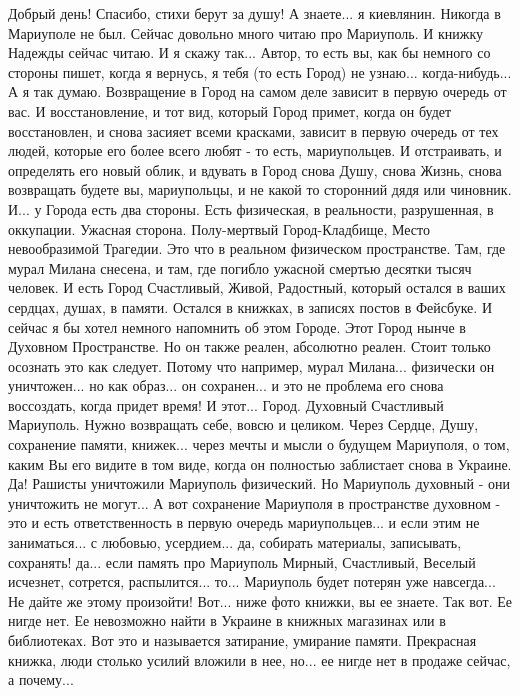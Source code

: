 Добрый день! Спасибо, стихи берут за душу! А знаете... я киевлянин. Никогда в
Мариуполе не был. Сейчас довольно много читаю про Мариуполь. И книжку Надежды
сейчас читаю. И я скажу так... Автор, то есть вы, как бы немного со стороны
пишет, когда я вернусь, я тебя (то есть Город) не узнаю... когда-нибудь... А я
так думаю. Возвращение в Город на самом деле зависит в первую очередь от вас. И
восстановление, и тот вид, который Город примет, когда он будет восстановлен, и
снова засияет всеми красками, зависит в первую очередь от тех людей, которые
его более всего любят - то есть, мариупольцев. И отстраивать, и определять его
новый облик, и вдувать в Город снова Душу, снова Жизнь, снова возвращать будете
вы, мариупольцы, и не какой то сторонний дядя или чиновник. И... у Города есть
два стороны. Есть физическая, в реальности, разрушенная, в оккупации. Ужасная
сторона. Полу-мертвый Город-Кладбище, Место невообразимой Трагедии. Это что в
реальном физическом пространстве. Там, где мурал Милана снесена, и там, где
погибло ужасной смертью десятки тысяч человек. И есть Город Счастливый, Живой,
Радостный, который остался в ваших сердцах, душах, в памяти. Остался в книжках,
в записях постов в Фейсбуке. И сейчас я бы хотел немного напомнить об этом
Городе. Этот Город нынче в Духовном Пространстве. Но он также реален, абсолютно
реален. Стоит только осознать это как следует. Потому что например, мурал
Милана... физически он уничтожен... но как образ... он сохранен... и это не
проблема его снова воссоздать, когда придет время! И этот... Город. Духовный
Счастливый Мариуполь. Нужно возвращать себе, вовсю и целиком. Через Сердце,
Душу, сохранение памяти, книжек... через мечты и мысли о будущем Мариуполя, о
том, каким Вы его видите в том виде, когда он полностью заблистает снова в
Украине. Да! Рашисты уничтожили Мариуполь физический. Но Мариуполь духовный -
они уничтожить не могут... А вот сохранение Мариуполя в пространстве духовном -
это и есть ответственность в первую очередь мариупольцев... и если этим не
заниматься... с любовью, усердием... да, собирать материалы, записывать,
сохранять! да... если память про Мариуполь Мирный, Счастливый, Веселый
исчезнет, сотрется, распылится... то... Мариуполь будет потерян уже навсегда...
Не дайте же этому произойти! Вот... ниже фото книжки, вы ее знаете. Так вот. Ее
нигде нет. Ее невозможно найти в Украине в книжных магазинах или в библиотеках.
Вот это и называется затирание, умирание памяти. Прекрасная книжка, люди
столько усилий вложили в нее, но... ее нигде нет в продаже сейчас, а почему...


